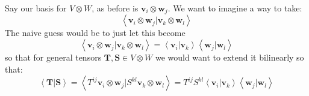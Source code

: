 \documentclass[../master.tex]{subfiles}
\begin{document}
	Say our basis for $V \otimes W$, as before is $\mathbf v_i \otimes \mathbf w_j$. We want to imagine a way to take:
	\begin{equation*}
		\left< \mathbf v_i \otimes \mathbf w_j | \mathbf v_k \otimes \mathbf w_l \right>
	\end{equation*}
	The naive guess would be to just let this become
	\begin{equation}\label{eq:tensor_inner_product_def}
		\left< \mathbf v_i \otimes \mathbf w_j | \mathbf v_k \otimes \mathbf w_l \right> = \left< \mathbf v_i | \mathbf v_k \right> \left< \mathbf w_j | \mathbf w_l \right> 
	\end{equation}
	so that for general tensors $\mathbf{T}, \mathbf{S} \in V \otimes W$ we would want to extend it bilinearly so that:
	\begin{equation}\label{eq:bilinear_tensor_inner_product}
		\left< \mathbf{T} | \mathbf{S} \right> 
		= \left< T^{ij} \mathbf v_i \otimes \mathbf w_j | S^{kl} \mathbf v_k \otimes \mathbf w_l \right> =  
		T^{ij} S^{kl} \left< \mathbf v_i | \mathbf v_k \right> \left< \mathbf w_j | \mathbf w_l \right> 
	\end{equation}
	
\end{document}
